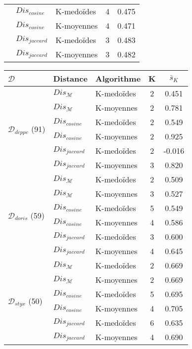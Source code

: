 \begin{table}[!htb]
\begin{subfigure}[ht]{0.49\textwidth}
\begin{tabular}[pos]{|l|l|l|c|c|}
	& $Dis_{cosine}$ & K-medoïdes & 4 & 0.475 \\ \cline{2-5}
	& $Dis_{cosine}$ & K-moyennes & 4 & 0.471  \\ \cline{2-5}
	& $Dis_{jaccard}$ & K-medoïdes & 3 & 0.483 \\ \cline{2-5}
	& $Dis_{jaccard}$ & K-moyennes & 3 & 0.482 \\ \hline
\end{tabular}
	\end{subfigure}
	\begin{subfigure}[ht]{0.49\textwidth}
		\begin{tabular}[pos]{|l|l|l|c|c|}
			\hline
			$\mathcal{D}$& \textbf{Distance} & \textbf{Algorithme}& \textbf{K}  & $\bar{s}_K$ \\ \hline
	\multirow{6}{\mrcell}{$\mathcal{D}_{dcppc}$ (91)} & $Dis_\mathcal{M}$ & K-medoïdes & 2 & 0.451  \\ \cline{2-5}
	& $Dis_\mathcal{M}$  & K-moyennes & 2 & 0.781  \\ \cline{2-5}
	& $Dis_{cosine}$ & K-medoïdes & 2 & 0.549 \\ \cline{2-5}
	& $Dis_{cosine}$ & K-moyennes & 2 & 0.925 \\ \cline{2-5}
	& $Dis_{jaccard}$ & K-medoïdes & 2 & -0.016  \\ \cline{2-5}
	& $Dis_{jaccard}$ & K-moyennes & 3 & 0.820 \\ \hline
	\multirow{6}{\mrcell}{$\mathcal{D}_{doris}$ (59)}  & $Dis_\mathcal{M}$ & K-medoïdes & 2 & 0.509  \\ \cline{2-5}
	& $Dis_\mathcal{M}$ & K-moyennes & 3 & 0.527  \\ \cline{2-5}
	& $Dis_{cosine}$ & K-medoïdes & 5 & 0.549 \\ \cline{2-5}
	& $Dis_{cosine}$ & K-moyennes & 4 & 0.586 \\ \cline{2-5}
	& $Dis_{jaccard}$ & K-medoïdes & 3 & 0.600 \\ \cline{2-5}
	& $Dis_{jaccard}$ & K-moyennes & 4 & 0.645 
	\\ \hline
	\multirow{6}{\mrcell}{$\mathcal{D}_{styx}$ (50)}  & $Dis_\mathcal{M}$ & K-medoïdes & 2 & 0.669 \\ \cline{2-5}
	& $Dis_\mathcal{M}$ & K-moyennes & 2 & 0.669 \\ \cline{2-5}
	& $Dis_{cosine}$ & K-medoïdes & 5 & 0.695 \\ \cline{2-5}
	& $Dis_{cosine}$ & K-moyennes & 4 & 0.705 \\ \cline{2-5}
	& $Dis_{jaccard}$ & K-medoïdes & 6 & 0.635 \\ \cline{2-5}
	& $Dis_{jaccard}$  & K-moyennes & 4 & 0.690 \\ \hline
	\end{tabular}
	\end{subfigure}


\end{table}
